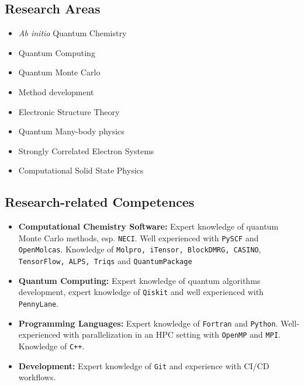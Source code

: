 \documentclass[11pt]{article}
\begin{document}
	\subsection*{Research Areas}
	\begin{multicols}{2}
		\begin{itemize}  \setlength\itemsep{0.1cm}
			\item \emph{Ab initio} Quantum Chemistry
			\item Quantum Computing
			\item Quantum Monte Carlo
			\item Method development
			
			
			
			\item Electronic Structure Theory
			\item Quantum Many-body physics
			\item Strongly Correlated Electron Systems
			
			\item Computational Solid State Physics
			
		\end{itemize}
	\end{multicols}
	\vspace*{0.2cm}
	\subsection*{Research-related Competences}
	
	\begin{itemize}
		\itemsep0pt
		\item \textbf{Computational Chemistry Software:} Expert knowledge of quantum Monte Carlo methods, esp. \texttt{NECI}. Well experienced with \texttt{PySCF} and \texttt{OpenMolcas}. Knowledge of 	\texttt{Molpro, iTensor, BlockDMRG, CASINO},\\ \texttt{TensorFlow, ALPS, Triqs} and \texttt{QuantumPackage}
		\item \textbf{Quantum Computing:} Expert knowledge of quantum algorithms development, expert knowledge of \texttt{Qiskit} and well experienced with \texttt{PennyLane}.
		\item \textbf{Programming Languages:} Expert knowledge of \texttt{Fortran} and \texttt{Python}. Well-experienced with parallelization in an HPC setting with \texttt{OpenMP} and \texttt{MPI}. Knowledge of \texttt{C++}.
		\item \textbf{Development:} Expert knowledge of \texttt{Git} and experience with CI/CD workflows. 
	\end{itemize}
	
\end{document}
